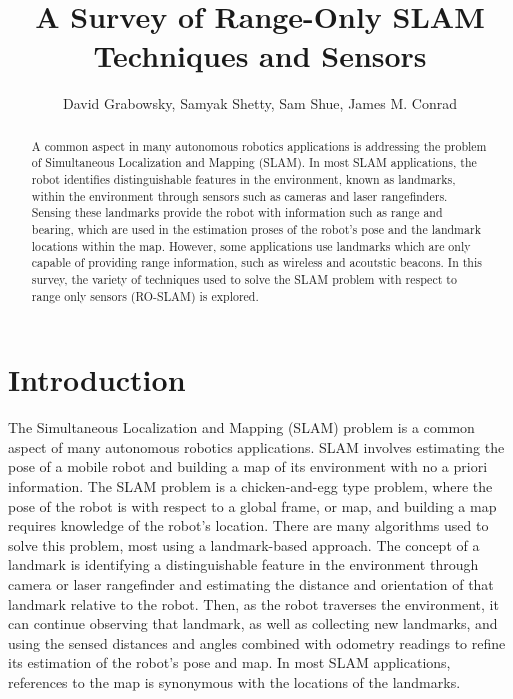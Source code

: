 \documentclass[conference]{IEEEtran}
\begin{document}
	
	\title{A Survey of Range-Only SLAM Techniques and Sensors}
	
	
	
	\author{David Grabowsky, Samyak Shetty, Sam Shue, James M. Conrad}
	
	
	
	
	
	
	
	
	
	
	\maketitle
	
	
	
	
	
	\begin{abstract}
		 A common aspect in many autonomous robotics applications is addressing the problem of Simultaneous Localization and Mapping (SLAM). In most SLAM applications, the robot identifies distinguishable features in the environment, known as landmarks, within the environment through sensors such as cameras and laser rangefinders. Sensing these landmarks provide the robot with information such as range and bearing, which are used in the estimation proses of the robot's pose and the landmark locations within the map. However, some applications use landmarks which are only capable of providing range information, such as wireless and acoutstic beacons. In this survey, the variety of techniques used to solve the SLAM problem with respect to range only sensors (RO-SLAM) is explored. 	
	\end{abstract}

	
	\section{Introduction} 
	
	The Simultaneous Localization and Mapping (SLAM) problem is a common aspect of many autonomous robotics applications. SLAM involves estimating the pose of a mobile robot and building a map of its environment with no a priori information. The SLAM problem is a chicken-and-egg type problem, where the pose of the robot is with respect to a global frame, or map, and building a map requires knowledge of the robot's location. There are many algorithms used to solve this problem, most using a landmark-based approach. The concept of a landmark is identifying a distinguishable feature in the environment through camera or laser rangefinder and estimating the distance and orientation of that landmark relative to the robot. Then, as the robot traverses the environment, it can continue observing that landmark, as well as collecting new landmarks, and using the sensed distances and angles combined with odometry readings to refine its estimation of the robot's pose and map. In most SLAM applications, references to the map is synonymous with the locations of the landmarks.
	
\end{document}
